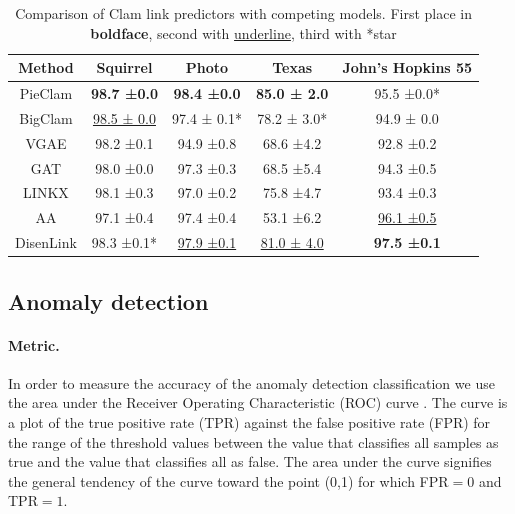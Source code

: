 \documentclass{article}
\theoremstyle{plain}
\theoremstyle{definition}
\theoremstyle{remark}
\begin{document}

 \begin{table}[t]
    \centering
    \begin{tabular}{|c|c|c|c|c|}
        \hline
        Method  & Squirrel        & Photo           & Texas        & John's Hopkins 55 \\
        \hline
        PieClam & \textbf{98.7 ±0.0} & \textbf{98.4 ±0.0}     &   \textbf{85.0 ± 2.0}           & 95.5 ±0.0*     \\
        \hline
        BigClam & \underline{98.5 ± 0.0}& 97.4 ± 0.1*  & 78.2 ± 3.0*& 94.9 ± 0.0 \\
        VGAE    &   98.2 ±0.1   &94.9 ±0.8  & 68.6 ±4.2 & 92.8 ±0.2 \\
        GAT     &   98.0 ±0.0   &97.3 ±0.3  & 68.5 ±5.4 &   94.3 ±0.5\\
        LINKX   &   98.1 ±0.3   &97.0 ±0.2  & 75.8 ±4.7 &   93.4 ±0.3 \\
        AA      &   97.1 ±0.4 &97.4 ±0.4  & 53.1 ±6.2 &  \underline{96.1 ±0.5}  \\
        DisenLink & 98.3 ±0.1* & \underline{97.9 ±0.1} & \underline{81.0 ± 4.0} &   \textbf{97.5 ±0.1} \\
        \hline
    \end{tabular}
    \caption{Comparison of Clam link predictors with competing models. First place in \textbf{boldface}, second with \underline{underline}, third with *star}
    \label{table: link table}
\end{table}


\subsection{Anomaly detection}


\paragraph{Metric.} In order to measure the accuracy of the anomaly detection classification we use the area under the Receiver Operating Characteristic (ROC) curve \cite{peterson1954roc}. The curve is a plot of the true positive rate (TPR) against the false positive rate (FPR) for the range of the threshold values between the value that classifies all samples as true and the value that classifies all as false. The area under the curve signifies the general tendency of the curve toward the point (0,1) for which FPR$= 0$ and TPR$= 1$.
\end{document}
